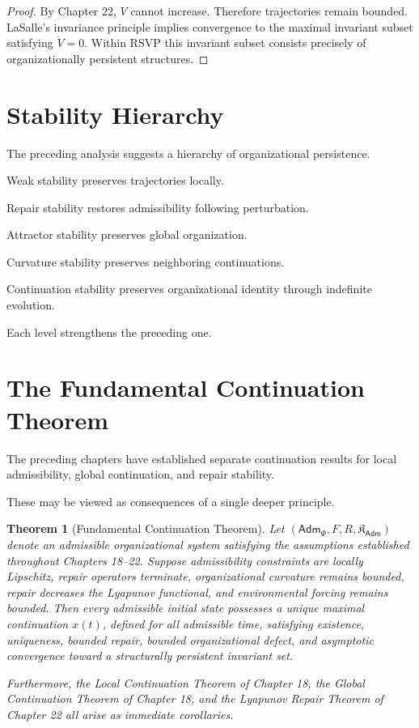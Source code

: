 \documentclass[11pt,oneside]{book}
\numberwithin{equation}{chapter}
\theoremstyle{definition}
\theoremstyle{plain}
\newtheorem{theorem}[definition]{Theorem}
\newcommand{\Adm}{\mathsf{Adm}}
\begin{document}
\begin{proof}
By Chapter 22, \(V\) cannot increase. Therefore trajectories remain bounded.
LaSalle's invariance principle implies convergence to the maximal invariant
subset satisfying \(\dot V=0\). Within RSVP this invariant subset consists
precisely of organizationally persistent structures.
\end{proof}

\section{Stability Hierarchy}

The preceding analysis suggests a hierarchy of organizational persistence.

Weak stability preserves trajectories locally.

Repair stability restores admissibility following perturbation.

Attractor stability preserves global organization.

Curvature stability preserves neighboring continuations.

Continuation stability preserves organizational identity through indefinite
evolution.

Each level strengthens the preceding one.

\section{The Fundamental Continuation Theorem}

The preceding chapters have established separate continuation results for
local admissibility, global continuation, and repair stability.

These may be viewed as consequences of a single deeper principle.

\begin{theorem}[Fundamental Continuation Theorem]
Let \((\Adm_\Phi,F,R,\mathfrak K_\Adm)\) denote an admissible organizational
system satisfying the assumptions established throughout Chapters 18--22.
Suppose admissibility constraints are locally Lipschitz, repair operators
terminate, organizational curvature remains bounded, repair decreases the
Lyapunov functional, and environmental forcing remains bounded. Then every
admissible initial state possesses a unique maximal continuation \(x(t)\),
defined for all admissible time, satisfying existence, uniqueness, bounded
repair, bounded organizational defect, and asymptotic convergence toward a
structurally persistent invariant set.

Furthermore, the Local Continuation Theorem of Chapter 18, the Global
Continuation Theorem of Chapter 18, and the Lyapunov Repair Theorem of
Chapter 22 all arise as immediate corollaries.
\end{theorem}
\end{document}
